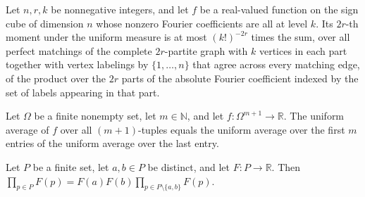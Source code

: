 \begin{theorem}
\label{FABL.homogeneous_evenMoment_le_matchingLabeling_sum}
\leanok
{}
Let $n,r,k$ be nonnegative integers, and let $f$ be a real-valued function on the sign
cube of dimension $n$ whose nonzero Fourier coefficients are all at level $k$. Its
$2r$-th moment under the uniform measure is at most $(k!)^{-2r}$ times the sum, over all
perfect matchings of the complete $2r$-partite graph with $k$ vertices in each part
together with vertex labelings by $\{1,\ldots,n\}$ that agree across every matching
edge, of the product over the $2r$ parts of the absolute Fourier coefficient indexed by
the set of labels appearing in that part.
\end{theorem}

\begin{theorem}
\label{FABL.expect_fin_snoc}
\leanok
{}
Let $\Omega$ be a finite nonempty set, let $m\in\mathbb N$, and let
$f:\Omega^{m+1}\to\mathbb R$. The uniform average of $f$ over all $(m+1)$-tuples equals
the uniform average over the first $m$ entries of the uniform average over the last
entry.
\end{theorem}

\begin{theorem}
\label{FABL.prod_eq_mul_mul_prod_erase_two}
\leanok
{}
Let $P$ be a finite set, let $a,b\in P$ be distinct, and let $F:P\to\mathbb R$. Then
$\prod_{p\in P}F(p)=F(a)F(b)\prod_{p\in P\setminus\{a,b\}}F(p)$.
\end{theorem}

